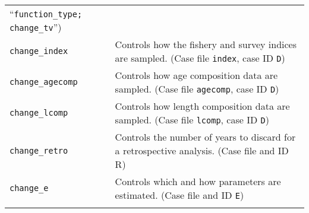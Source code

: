 \documentclass[11pt]{article}
\begin{document}
\begin{spacing}{1.2}
\begin{longtable}[c]{@{}ll@{}}
\begin{minipage}[t]{0.57\columnwidth}
``\texttt{function\_type; change\_tv}'')
\end{minipage}
\\\noalign{\medskip}
\begin{minipage}[t]{0.32\columnwidth}\raggedright
\texttt{change\_index}
\end{minipage} & \begin{minipage}[t]{0.57\columnwidth}\raggedright
Controls how the fishery and survey indices are sampled. (Case file
\texttt{index}, case ID \texttt{D})
\end{minipage}
\\\noalign{\medskip}
\begin{minipage}[t]{0.32\columnwidth}\raggedright
\texttt{change\_agecomp}
\end{minipage} & \begin{minipage}[t]{0.57\columnwidth}\raggedright
Controls how age composition data are sampled. (Case file \texttt{agecomp},
case ID \texttt{D})
\end{minipage}
\\\noalign{\medskip}
\begin{minipage}[t]{0.32\columnwidth}\raggedright
\texttt{change\_lcomp}
\end{minipage} & \begin{minipage}[t]{0.57\columnwidth}\raggedright
Controls how length composition data are sampled. (Case file \texttt{lcomp},
case ID \texttt{D})
\end{minipage}
\\\noalign{\medskip}
\begin{minipage}[t]{0.32\columnwidth}\raggedright
\texttt{change\_retro}
\end{minipage} & \begin{minipage}[t]{0.57\columnwidth}\raggedright
Controls the number of years to discard for a retrospective analysis. (Case
file and ID \textsf{R})
\end{minipage}
\\\noalign{\medskip}
\begin{minipage}[t]{0.32\columnwidth}\raggedright
\texttt{change\_e}
\end{minipage} & \begin{minipage}[t]{0.57\columnwidth}\raggedright
Controls which and how parameters are estimated. (Case file and ID \texttt{E})
\end{minipage}
\\\noalign{\medskip}
\begin{minipage}[t]{0.32\columnwidth}\raggedright

\end{minipage}
\end{longtable}
\end{spacing}
\end{document}
